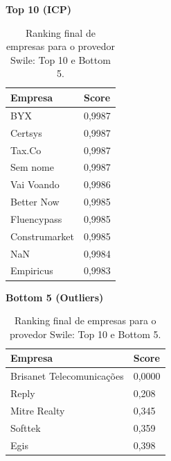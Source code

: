 \begin{table}[p]
    \centering
    \caption{Ranking final de empresas para o provedor Swile: Top 10 e Bottom 5.}
    \label{tab:7_7_ranking_swile}
    \begin{minipage}{0.48\textwidth}
    \centering
    \textbf{Top 10 (ICP)}\\
    \begin{tabular}{p{5cm}p{1.8cm}}
    \toprule
    Empresa & Score \\
    \midrule
    BYX & 0,9987 \\
    Certsys & 0,9987 \\
    Tax.Co & 0,9987 \\
    Sem nome & 0,9987 \\
    Vai Voando & 0,9986 \\
    Better Now & 0,9985 \\
    Fluencypass & 0,9985 \\
    Construmarket & 0,9985 \\
    NaN & 0,9984 \\
    Empiricus & 0,9983 \\
    \bottomrule
    \end{tabular}
    \end{minipage}\hfill
    \begin{minipage}{0.48\textwidth}
    \centering
    \textbf{Bottom 5 (Outliers)}\\
    \begin{tabular}{p{5cm}p{1.8cm}}
    \toprule
    Empresa & Score \\
    \midrule
    Brisanet Telecomunicações & 0,0000 \\
    Reply & 0,208 \\
    Mitre Realty & 0,345 \\
    Softtek & 0,359 \\
    Egis & 0,398 \\
    \bottomrule
    \end{tabular}
    \end{minipage}
\end{table}
